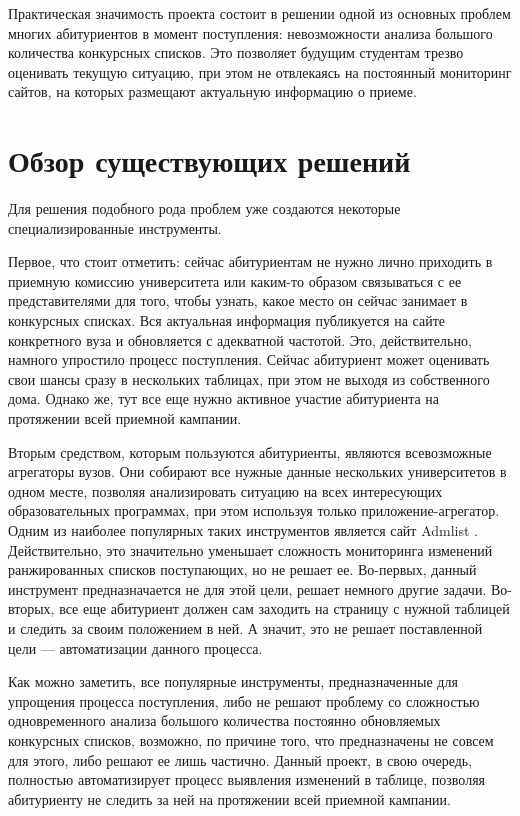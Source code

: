 \documentclass[a4paper,article,14pt]{extarticle}
\begin{document}
Практическая значимость проекта состоит в решении одной из основных проблем многих абитуриентов в момент поступления: невозможности анализа большого количества конкурсных списков. Это позволяет будущим студентам трезво оценивать текущую ситуацию, при этом не отвлекаясь на постоянный мониторинг сайтов, на которых размещают актуальную информацию о приеме.
\pagebreak

\section{Обзор существующих решений}

Для решения подобного рода проблем уже создаются некоторые специализированные инструменты.

Первое, что стоит отметить: сейчас абитуриентам не нужно лично приходить в приемную комиссию университета или каким-то образом связываться с ее представителями для того, чтобы узнать, какое место он сейчас занимает в конкурсных списках. Вся актуальная информация публикуется на сайте конкретного вуза и обновляется с адекватной частотой. Это, действительно, намного упростило процесс поступления. Сейчас абитуриент может оценивать свои шансы сразу в нескольких таблицах, при этом не выходя из собственного дома. Однако же, тут все еще нужно активное участие абитуриента на протяжении всей приемной кампании.

Вторым средством, которым пользуются абитуриенты, являются всевозможные агрегаторы вузов. Они собирают все нужные данные нескольких университетов в одном месте, позволяя анализировать ситуацию на всех интересующих образовательных программах, при этом используя только приложение-агрегатор. Одним из наиболее популярных таких инструментов является сайт Admlist \cite{admlist}. Действительно, это значительно уменьшает сложность мониторинга изменений ранжированных списков поступающих, но не решает ее. Во-первых, данный инструмент предназначается не для этой цели, решает немного другие задачи. Во-вторых, все еще абитуриент должен сам заходить на страницу с нужной таблицей и следить за своим положением в ней. А значит, это не решает поставленной цели — автоматизации данного процесса.

Как можно заметить, все популярные инструменты, предназначенные для упрощения процесса поступления, либо не решают проблему со сложностью одновременного анализа большого количества постоянно обновляемых конкурсных списков, возможно, по причине того, что предназначены не совсем для этого, либо решают ее лишь частично. Данный проект, в свою очередь, полностью автоматизирует процесс выявления изменений в таблице, позволяя абитуриенту не следить за ней на протяжении всей приемной кампании.
\pagebreak
\end{document}
